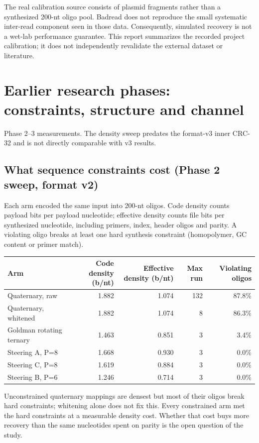 \documentclass[11pt,a4paper]{article}
\newcommand{\pageheading}[2]{\clearpage\section{#1}{\color{muted}\small #2}\par\vspace{5pt}}
\begin{document}
The real calibration source consists of plasmid fragments rather than a synthesized
200-nt oligo pool. Badread does not reproduce the small systematic inter-read component
seen in those data. Consequently, simulated recovery is not a wet-lab performance
guarantee. This report summarizes the recorded project calibration; it does not
independently revalidate the external dataset or literature.

\pageheading{Earlier research phases: constraints, structure and channel}{Phase 2--3 measurements. The density sweep predates the format-v3 inner CRC-32 and is not directly comparable with v3 results.}
\subsection*{What sequence constraints cost (Phase 2 sweep, format v2)}
Each arm encoded the same input into 200-nt oligos. Code density counts payload bits per
payload nucleotide; effective density counts file bits per synthesized nucleotide,
including primers, index, header oligos and parity. A violating oligo breaks at least one
hard synthesis constraint (homopolymer, GC content or primer match).
\begin{center}\small
\begin{tabular}{lrrrr}
\toprule
Arm & Code density (b/nt) & Effective density (b/nt) & Max run & Violating oligos\\
\midrule
Quaternary, raw & 1.882 & 1.074 & 132 & 87.8\% \\
Quaternary, whitened & 1.882 & 1.074 & 8 & 86.3\% \\
Goldman rotating ternary & 1.463 & 0.851 & 3 & 3.4\% \\
Steering A, P=8 & 1.668 & 0.930 & 3 & 0.0\% \\
Steering C, P=8 & 1.619 & 0.884 & 3 & 0.0\% \\
Steering B, P=6 & 1.246 & 0.714 & 3 & 0.0\% \\
\bottomrule
\end{tabular}
\end{center}
Unconstrained quaternary mappings are densest but most of their oligos break hard
constraints; whitening alone does not fix this. Every constrained arm met the hard
constraints at a measurable density cost. Whether that cost buys more recovery than the
same nucleotides spent on parity is the open question of the study.
\end{document}
